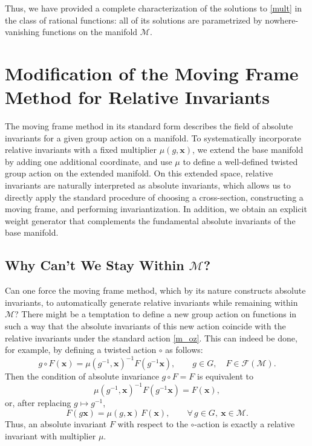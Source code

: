 \documentclass[12pt,reqno]{amsart}
\begin{document}
\medskip

Thus, we have provided a complete characterization of the solutions to \eqref{mult} in the class of rational functions:
all of its solutions are parametrized by nowhere-vanishing functions on the manifold
$\mathcal M$.






\section{Modification of the Moving Frame Method for Relative Invariants}

The moving frame method in its standard form describes the field of absolute invariants for a given group action on a manifold. To systematically incorporate relative invariants with a fixed multiplier $\mu(g,\boldsymbol x)$, we extend the base manifold by adding one additional coordinate, and use $\mu$ to define a well-defined twisted group action on the extended manifold. On this extended space, relative invariants are naturally interpreted as absolute invariants, which allows us to directly apply the standard procedure of choosing a cross-section, constructing a moving frame, and performing invariantization. In addition, we obtain an explicit weight generator that complements the fundamental absolute invariants of the base manifold.

\subsection{Why Can't We Stay Within $\mathcal M$?}

Can one force the moving frame method, which by its nature constructs absolute invariants, to automatically generate relative invariants while remaining within $\mathcal M$?
There might be a temptation to define a new group action on functions in such a way that the absolute invariants of this new action coincide with the relative invariants under the standard action \eqref{m_oz}. This can indeed be done, for example, by defining a twisted action $\circ$ as follows:
$$
g \circ F(\boldsymbol x) = \mu(g^{-1}, \boldsymbol x)^{-1} F(g^{-1} \boldsymbol x), 
\qquad g \in G,\quad F \in \mathcal F(\mathcal M).
$$
Then the condition of absolute invariance $g \circ F = F$ is equivalent to
$$
\mu(g^{-1}, \boldsymbol x)^{-1} F(g^{-1} \boldsymbol x) = F(\boldsymbol x),
$$
or, after replacing $g \mapsto g^{-1}$,
$$
F(g \boldsymbol x) = \mu(g, \boldsymbol x)\, F(\boldsymbol x),
\qquad \forall\, g \in G,\ \boldsymbol x \in \mathcal M.
$$
Thus, an absolute invariant $F$ with respect to the $\circ$-action is exactly a relative invariant with multiplier $\mu$.
\end{document}
